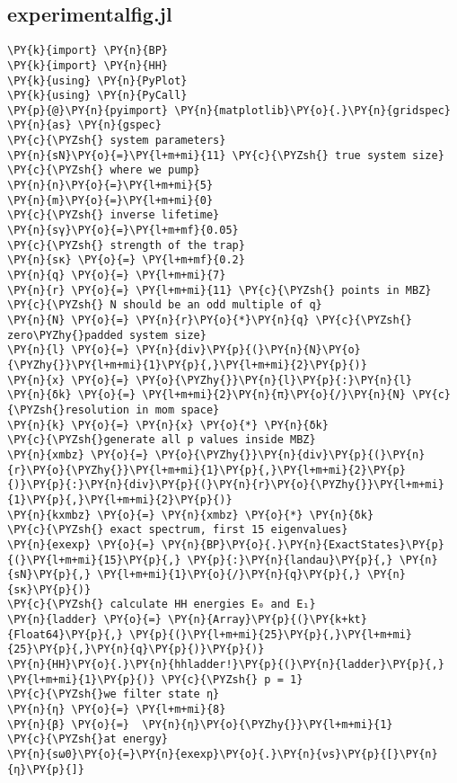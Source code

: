 \subsection{experimental\textunderscore fig.jl}\label{subsec:experimental}
\begin{Verbatim}[commandchars=\\\{\}]
\PY{k}{import} \PY{n}{BP}
\PY{k}{import} \PY{n}{HH}
\PY{k}{using} \PY{n}{PyPlot}
\PY{k}{using} \PY{n}{PyCall}
\PY{p}{@}\PY{n}{pyimport} \PY{n}{matplotlib}\PY{o}{.}\PY{n}{gridspec} \PY{n}{as} \PY{n}{gspec}
\PY{c}{\PYZsh{} system parameters}
\PY{n}{sN}\PY{o}{=}\PY{l+m+mi}{11} \PY{c}{\PYZsh{} true system size}
\PY{c}{\PYZsh{} where we pump}
\PY{n}{n}\PY{o}{=}\PY{l+m+mi}{5}
\PY{n}{m}\PY{o}{=}\PY{l+m+mi}{0}
\PY{c}{\PYZsh{} inverse lifetime}
\PY{n}{sγ}\PY{o}{=}\PY{l+m+mf}{0.05}
\PY{c}{\PYZsh{} strength of the trap}
\PY{n}{sκ} \PY{o}{=} \PY{l+m+mf}{0.2}
\PY{n}{q} \PY{o}{=} \PY{l+m+mi}{7}
\PY{n}{r} \PY{o}{=} \PY{l+m+mi}{11} \PY{c}{\PYZsh{} points in MBZ}
\PY{c}{\PYZsh{} N should be an odd multiple of q}
\PY{n}{N} \PY{o}{=} \PY{n}{r}\PY{o}{*}\PY{n}{q} \PY{c}{\PYZsh{} zero\PYZhy{}padded system size}
\PY{n}{l} \PY{o}{=} \PY{n}{div}\PY{p}{(}\PY{n}{N}\PY{o}{\PYZhy{}}\PY{l+m+mi}{1}\PY{p}{,}\PY{l+m+mi}{2}\PY{p}{)}
\PY{n}{x} \PY{o}{=} \PY{o}{\PYZhy{}}\PY{n}{l}\PY{p}{:}\PY{n}{l}
\PY{n}{δk} \PY{o}{=} \PY{l+m+mi}{2}\PY{n}{π}\PY{o}{/}\PY{n}{N} \PY{c}{\PYZsh{}resolution in mom space}
\PY{n}{k} \PY{o}{=} \PY{n}{x} \PY{o}{*} \PY{n}{δk}
\PY{c}{\PYZsh{}generate all p values inside MBZ}
\PY{n}{xmbz} \PY{o}{=} \PY{o}{\PYZhy{}}\PY{n}{div}\PY{p}{(}\PY{n}{r}\PY{o}{\PYZhy{}}\PY{l+m+mi}{1}\PY{p}{,}\PY{l+m+mi}{2}\PY{p}{)}\PY{p}{:}\PY{n}{div}\PY{p}{(}\PY{n}{r}\PY{o}{\PYZhy{}}\PY{l+m+mi}{1}\PY{p}{,}\PY{l+m+mi}{2}\PY{p}{)}
\PY{n}{kxmbz} \PY{o}{=} \PY{n}{xmbz} \PY{o}{*} \PY{n}{δk}
\PY{c}{\PYZsh{} exact spectrum, first 15 eigenvalues}
\PY{n}{exexp} \PY{o}{=} \PY{n}{BP}\PY{o}{.}\PY{n}{ExactStates}\PY{p}{(}\PY{l+m+mi}{15}\PY{p}{,} \PY{p}{:}\PY{n}{landau}\PY{p}{,} \PY{n}{sN}\PY{p}{,} \PY{l+m+mi}{1}\PY{o}{/}\PY{n}{q}\PY{p}{,} \PY{n}{sκ}\PY{p}{)}
\PY{c}{\PYZsh{} calculate HH energies E₀ and E₁}
\PY{n}{ladder} \PY{o}{=} \PY{n}{Array}\PY{p}{(}\PY{k+kt}{Float64}\PY{p}{,} \PY{p}{(}\PY{l+m+mi}{25}\PY{p}{,}\PY{l+m+mi}{25}\PY{p}{,}\PY{n}{q}\PY{p}{)}\PY{p}{)}
\PY{n}{HH}\PY{o}{.}\PY{n}{hhladder!}\PY{p}{(}\PY{n}{ladder}\PY{p}{,} \PY{l+m+mi}{1}\PY{p}{)} \PY{c}{\PYZsh{} p = 1}
\PY{c}{\PYZsh{}we filter state η}
\PY{n}{η} \PY{o}{=} \PY{l+m+mi}{8}
\PY{n}{β} \PY{o}{=}  \PY{n}{η}\PY{o}{\PYZhy{}}\PY{l+m+mi}{1}
\PY{c}{\PYZsh{}at energy}
\PY{n}{sω0}\PY{o}{=}\PY{n}{exexp}\PY{o}{.}\PY{n}{νs}\PY{p}{[}\PY{n}{η}\PY{p}{]}

\end{Verbatim}
